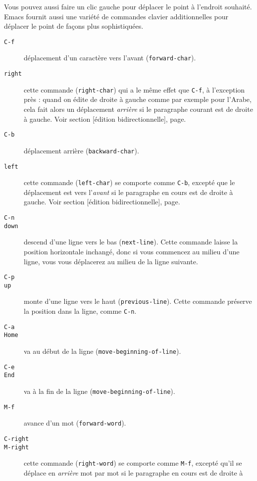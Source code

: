 Vous pouvez aussi faire un clic gauche pour déplacer le point à
l'endroit souhaité. Emacs fournit aussi une variété de commandes
clavier additionnelles pour déplacer le point de façons plus
sophistiquées.\par
\begin{description}
\item[\texttt{C-f}] déplacement d'un caractère vers l'avant
  (\texttt{forward-char}). 
\item[\texttt{right}] cette commande (\texttt{right-char}) qui a le
  même effet que \texttt{C-f}, à l'exception près : quand on édite de
  droite à gauche comme par exemple pour l'Arabe, cela fait alors un
  déplacement \emph{arrière} si le paragraphe courant est de droite à
  gauche. Voir section [édition bidirectionnelle],
  page. 
\item[\texttt{C-b}] déplacement arrière (\texttt{backward-char}).
\item[\texttt{left}] cette commande (\texttt{left-char}) se comporte
  comme \texttt{C-b}, excepté que le déplacement est vers
  l'\emph{avant} si le paragraphe en cours est de droite à
  gauche. Voir section [édition bidirectionnelle],
  page.   
\item[\texttt{C-n}]
\item[\texttt{down}] descend d'une ligne vers le bas
  (\texttt{next-line}). Cette commande laisse la position horizontale
  inchangé, donc si vous commencez au milieu d'une ligne, vous vous
  déplacerez au milieu de la ligne suivante.
\item[\texttt{C-p}]
\item[\texttt{up}] monte d'une ligne vers le haut
  (\texttt{previous-line}). Cette commande préserve la position dans
  la ligne, comme \texttt{C-n}.
\item[\texttt{C-a}]
\item[\texttt{Home}] va au début de la ligne
  (\texttt{move-beginning-of-line}). 
\item[\texttt{C-e}]
\item[\texttt{End}] va à la fin de la ligne
  (\texttt{move-beginning-of-line}).
\item[\texttt{M-f}] avance d'un mot (\texttt{forward-word}).
\item[\texttt{C-right}]
\item[\texttt{M-right}] cette commande (\texttt{right-word}) se
  comporte comme \texttt{M-f}, excepté qu'il se déplace en
  \emph{arrière} mot par mot si le paragraphe en cours est de droite à

\end{description}
